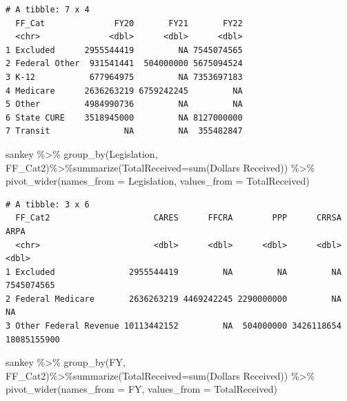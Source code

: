 \documentclass[
  letterpaper,
  DIV=11,
  numbers=noendperiod]{scrreport}
\newenvironment{Shaded}{\begin{snugshade}}{\end{snugshade}}
\newcommand{\AttributeTok}[1]{\textcolor[rgb]{0.40,0.45,0.13}{#1}}
\newcommand{\FunctionTok}[1]{\textcolor[rgb]{0.28,0.35,0.67}{#1}}
\newcommand{\NormalTok}[1]{\textcolor[rgb]{0.00,0.23,0.31}{#1}}
\newcommand{\SpecialCharTok}[1]{\textcolor[rgb]{0.37,0.37,0.37}{#1}}
\newcommand{\StringTok}[1]{\textcolor[rgb]{0.13,0.47,0.30}{#1}}
\begin{document}
\begin{verbatim}
# A tibble: 7 x 4
  FF_Cat              FY20       FY21       FY22
  <chr>              <dbl>      <dbl>      <dbl>
1 Excluded      2955544419         NA 7545074565
2 Federal Other  931541441  504000000 5675094524
3 K-12           677964975         NA 7353697183
4 Medicare      2636263219 6759242245         NA
5 Other         4984990736         NA         NA
6 State CURE    3518945000         NA 8127000000
7 Transit               NA         NA  355482847
\end{verbatim}

\begin{Shaded}
\begin{Highlighting}[]
\NormalTok{sankey }\SpecialCharTok{\%\textgreater{}\%} \FunctionTok{group\_by}\NormalTok{(Legislation, FF\_Cat2)}\SpecialCharTok{\%\textgreater{}\%}\FunctionTok{summarize}\NormalTok{(}\AttributeTok{TotalReceived=}\FunctionTok{sum}\NormalTok{(}\StringTok{\textasciigrave{}}\AttributeTok{Dollars Received}\StringTok{\textasciigrave{}}\NormalTok{)) }\SpecialCharTok{\%\textgreater{}\%} \FunctionTok{pivot\_wider}\NormalTok{(}\AttributeTok{names\_from =}\NormalTok{ Legislation, }\AttributeTok{values\_from =}\NormalTok{ TotalReceived)}
\end{Highlighting}
\end{Shaded}

\begin{verbatim}
# A tibble: 3 x 6
  FF_Cat2                     CARES      FFCRA        PPP      CRRSA        ARPA
  <chr>                       <dbl>      <dbl>      <dbl>      <dbl>       <dbl>
1 Excluded               2955544419         NA         NA         NA  7545074565
2 Federal Medicare       2636263219 4469242245 2290000000         NA          NA
3 Other Federal Revenue 10113442152         NA  504000000 3426118654 18085155900
\end{verbatim}

\begin{Shaded}
\begin{Highlighting}[]
\NormalTok{sankey }\SpecialCharTok{\%\textgreater{}\%} \FunctionTok{group\_by}\NormalTok{(FY, FF\_Cat2)}\SpecialCharTok{\%\textgreater{}\%}\FunctionTok{summarize}\NormalTok{(}\AttributeTok{TotalReceived=}\FunctionTok{sum}\NormalTok{(}\StringTok{\textasciigrave{}}\AttributeTok{Dollars Received}\StringTok{\textasciigrave{}}\NormalTok{)) }\SpecialCharTok{\%\textgreater{}\%} \FunctionTok{pivot\_wider}\NormalTok{(}\AttributeTok{names\_from =}\NormalTok{ FY, }\AttributeTok{values\_from =}\NormalTok{ TotalReceived)}
\end{Highlighting}
\end{Shaded}
\end{document}
